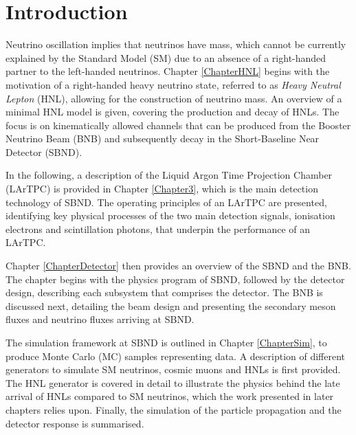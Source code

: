 
\chapter{Introduction}  %

Neutrino oscillation implies that neutrinos have mass, which cannot be currently explained by the Standard Model (SM) due to an absence of a right-handed partner to the left-handed neutrinos.  
Chapter \ref{ChapterHNL}  begins with the motivation of a right-handed heavy neutrino state, referred to as \textit{Heavy Neutral Lepton} (HNL), allowing for the construction of neutrino mass.
An overview of a minimal HNL model is given, covering the production and decay of HNLs.
The focus is on kinematically allowed channels that can be produced from the Booster Neutrino Beam (BNB) and subsequently decay in the Short-Baseline Near Detector (SBND).

In the following, a description of the Liquid Argon Time Projection Chamber (LArTPC) is provided in Chapter \ref{Chapter3}, which is the main detection technology of SBND.
The operating principles of an LArTPC are presented, identifying key physical processes of the two main detection signals, ionisation electrons and scintillation photons, that underpin the performance of an LArTPC.

Chapter \ref{ChapterDetector} then provides an overview of the SBND and the BNB.
The chapter begins with the physics program of SBND, followed by the detector design, describing each subsystem that comprises the detector.
The BNB is discussed next, detailing the beam design and presenting the secondary meson fluxes and neutrino fluxes arriving at SBND.

The simulation framework at SBND is outlined in Chapter \ref{ChapterSim}, to produce Monte Carlo (MC) samples representing data.
A description of different generators to simulate SM neutrinos, cosmic muons and HNLs is first provided.
The HNL generator is covered in detail to illustrate the physics behind the late arrival of HNLs compared to SM neutrinos, which the work presented in later chapters relies upon.  
Finally, the simulation of the particle propagation and the detector response is summarised.

